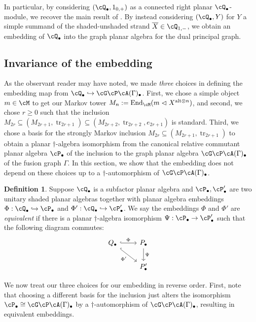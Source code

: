 \documentclass[11pt]{article}
\theoremstyle{plain}
\theoremstyle{definition}
\newtheorem{defn}[thm]{Definition}
\DeclareMathOperator{\End}{End}
\DeclareMathOperator{\tr}{tr}
\begin{document}
In particular, by considering $(\cQ_\bullet,1_{0,+})$ as a connected right planar $\cQ_\bullet$-module, we recover the main result of \cite{MR2812459}. 
By instead considering $(\cQ_\bullet,Y)$ for $Y$ a simple summand of the shaded-unshaded strand $\overline{X}\in \cQ_{1,-}$, we obtain an embedding of $\cQ_\bullet$ into the graph planar algebra for the dual principal graph.

\subsection{Invariance of the embedding}
\label{sec:InvarianceOfEmbedding}

As the observant reader may have noted, we made \emph{three} choices in defining the embedding map from $\cQ_\bullet \hookrightarrow\cG\cP\cA(\Gamma)_\bullet$.
First, we chose a simple object $m\in \cM$ to get our Markov tower $M_n := \End_\cM(m \vartriangleleft X^{\text{alt}\otimes n})$, and second, we chose $r\geq 0$ such that the inclusion $M_{2r}\subseteq (M_{2r+1}, \tr_{2r+1})\subseteq (M_{2r+2}, \tr_{2r+2}, e_{2r+1})$ is standard.
Third, we chose a basis for the strongly Markov inclusion $M_{2r}\subseteq (M_{2r+1}, \tr_{2r+1})$ to obtain a planar $\dag$-algebra isomorphism from the canonical relative commutant planar algebra $\cP_\bullet$ of the inclusion to the graph planar algebra $\cG\cP\cA(\Gamma)_\bullet$ of the fusion graph $\Gamma$.
In this section, we show that the embedding does not depend on these choices up to a $\dag$-automorphism of $\cG\cP\cA(\Gamma)_\bullet$.

\begin{defn}
Suppose $\cQ_\bullet$ is a subfactor planar algebra and $\cP_\bullet, \cP_\bullet'$ are two unitary shaded planar algebras together with planar algebra embeddings $\Phi: \cQ_\bullet \hookrightarrow \cP_\bullet$ and $\Phi': \cQ_\bullet \hookrightarrow \cP_\bullet'$.
We say the embeddings $\Phi$ and $\Phi'$ are \emph{equivalent} if there is a planar $\dag$-algebra isomorphism $\Psi: \cP_\bullet \to \cP_\bullet'$ such that the following diagram commutes:
$$
  \begin{tikzcd}
    Q_{\bullet} \arrow[hook]{r}{\Phi} \arrow[swap, hook]{dr}{\Phi'} & P_{\bullet} \arrow{d}{\Psi} 
    \\
     & P_{\bullet}'
  \end{tikzcd}
$$  
\end{defn}


We now treat our three choices for our embedding in reverse order.
First, note that choosing a different basis for the inclusion just alters the isomorphism $\cP_\bullet \cong \cG\cP\cA(\Gamma)_\bullet$ by a $\dag$-automorphism of $\cG\cP\cA(\Gamma)_\bullet$, resulting in equivalent embeddings.
\end{document}
